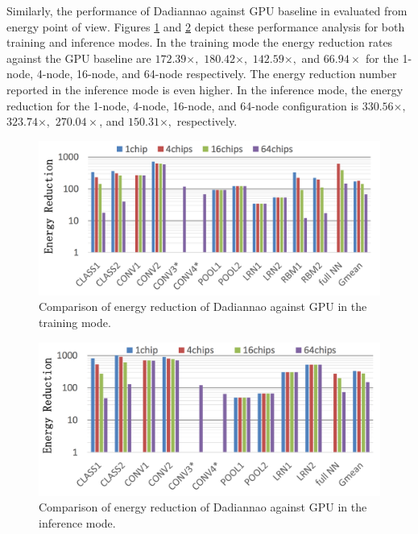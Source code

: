 \documentclass[runningheads,a4paper]{llncs}
\begin{document}
{Similarly, the performance of Dadiannao against GPU baseline in evaluated from energy point of view. Figures \ref{fig:dadiannao_training} and \ref{fig:dadiannao_inference} depict these performance analysis for both training and inference modes. In the training mode the energy reduction rates against the GPU baseline are $172.39\times,$ $180.42\times,$ $142.59\times,$ and $66.94\times$ for the 1-node, 4-node, 16-node, and 64-node respectively. The energy reduction number reported in the inference mode is even higher. In the inference mode, the energy reduction for the 1-node, 4-node, 16-node, and 64-node configuration is $330.56\times,$ $323.74\times,$ $270.04\times$, and $150.31\times,$ respectively.

\begin{figure}[!htb]
	\includegraphics[scale=0.45]{./images/dadiannao_training.png}
	\centering
	\caption{Comparison of energy reduction of Dadiannao against GPU in the training mode\cite{chen2014dadiannao}.}
	\label{fig:dadiannao_training}
\end{figure}
\begin{figure}[!htb]
	\includegraphics[scale=0.45]{./images/dadiannao_inference.png}
	\centering
	\caption{Comparison of energy reduction of Dadiannao against GPU in the inference mode\cite{chen2014dadiannao}.}
	\label{fig:dadiannao_inference}
\end{figure}

}
\end{document}
